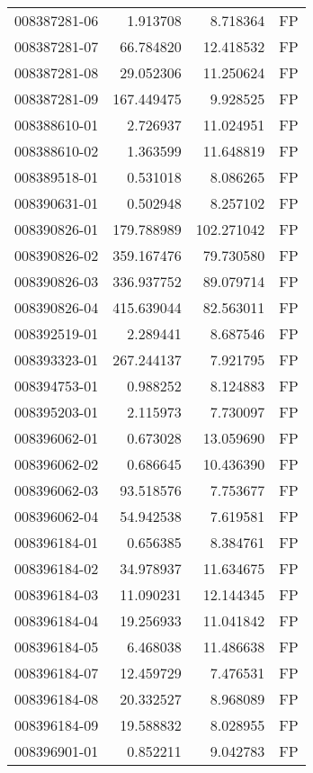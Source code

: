\begin{tabular}{lrrl}
008387281-06 &    1.913708 &     8.718364 &   FP \\
008387281-07 &   66.784820 &    12.418532 &   FP \\
008387281-08 &   29.052306 &    11.250624 &   FP \\
008387281-09 &  167.449475 &     9.928525 &   FP \\
008388610-01 &    2.726937 &    11.024951 &   FP \\
008388610-02 &    1.363599 &    11.648819 &   FP \\
008389518-01 &    0.531018 &     8.086265 &   FP \\
008390631-01 &    0.502948 &     8.257102 &   FP \\
008390826-01 &  179.788989 &   102.271042 &   FP \\
008390826-02 &  359.167476 &    79.730580 &   FP \\
008390826-03 &  336.937752 &    89.079714 &   FP \\
008390826-04 &  415.639044 &    82.563011 &   FP \\
008392519-01 &    2.289441 &     8.687546 &   FP \\
008393323-01 &  267.244137 &     7.921795 &   FP \\
008394753-01 &    0.988252 &     8.124883 &   FP \\
008395203-01 &    2.115973 &     7.730097 &   FP \\
008396062-01 &    0.673028 &    13.059690 &   FP \\
008396062-02 &    0.686645 &    10.436390 &   FP \\
008396062-03 &   93.518576 &     7.753677 &   FP \\
008396062-04 &   54.942538 &     7.619581 &   FP \\
008396184-01 &    0.656385 &     8.384761 &   FP \\
008396184-02 &   34.978937 &    11.634675 &   FP \\
008396184-03 &   11.090231 &    12.144345 &   FP \\
008396184-04 &   19.256933 &    11.041842 &   FP \\
008396184-05 &    6.468038 &    11.486638 &   FP \\
008396184-07 &   12.459729 &     7.476531 &   FP \\
008396184-08 &   20.332527 &     8.968089 &   FP \\
008396184-09 &   19.588832 &     8.028955 &   FP \\
008396901-01 &    0.852211 &     9.042783 &   FP \\

\end{tabular}
